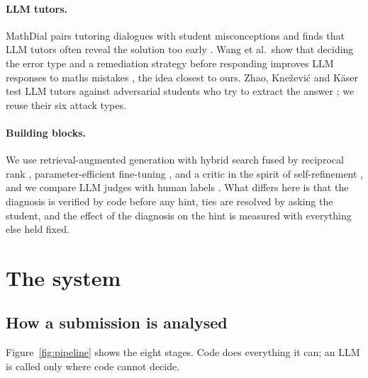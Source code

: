 \documentclass[11pt,a4paper]{article}
\begin{document}
\paragraph{LLM tutors.} MathDial pairs tutoring dialogues with student misconceptions and finds that LLM tutors often reveal the solution too early \cite{mathdial}. Wang et al.\ show that deciding the error type and a remediation strategy before responding improves LLM responses to maths mistakes \cite{bridge}, the idea closest to ours. Zhao, Kne\v{z}evi\'c and K\"aser test LLM tutors against adversarial students who try to extract the answer \cite{zhao2026}; we reuse their six attack types.

\paragraph{Building blocks.} We use retrieval-augmented generation \cite{rag} with hybrid search fused by reciprocal rank \cite{rrf}, parameter-efficient fine-tuning \cite{lora,qlora}, and a critic in the spirit of self-refinement \cite{selfrefine}, and we compare LLM judges with human labels \cite{zheng}. What differs here is that the diagnosis is verified by code before any hint, ties are resolved by asking the student, and the effect of the diagnosis on the hint is measured with everything else held fixed.

\section{The system}\label{sec:system}

\subsection{How a submission is analysed}

Figure~\ref{fig:pipeline} shows the eight stages. Code does everything it can; an LLM is called only where code cannot decide.
\end{document}
